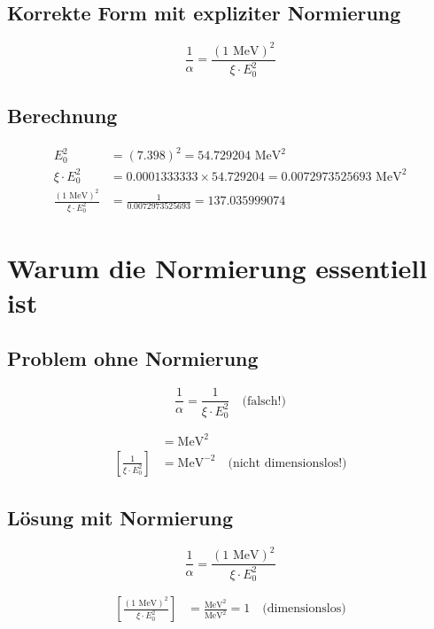 	\subsection*{Korrekte Form mit expliziter Normierung}
	
	\[
	\boxed{\frac{1}{\alpha} = \frac{(1 \text{ MeV})^2}{\xi \cdot E_0^2}}
	\]
	
	\subsection*{Berechnung}
	
	\begin{align*}
		E_0^2 &= (7.398)^2 = 54.729204 \text{ MeV}^2 \\
		\xi \cdot E_0^2 &= 0.0001333333 \times 54.729204 = 0.0072973525693 \text{ MeV}^2 \\
		\frac{(1 \text{ MeV})^2}{\xi \cdot E_0^2} &= \frac{1}{0.0072973525693} = 137.035999074
	\end{align*}
	
	\section*{Warum die Normierung essentiell ist}
	
	\subsection*{Problem ohne Normierung}
	
	\[
	\frac{1}{\alpha} = \frac{1}{\xi \cdot E_0^2} \quad \text{(falsch!)}
	\]
	
	\begin{align*}
		[\xi \cdot E_0^2] &= \text{MeV}^2 \\
		\left[\frac{1}{\xi \cdot E_0^2}\right] &= \text{MeV}^{-2} \quad \text{(nicht dimensionslos!)}
	\end{align*}
	
	\subsection*{Lösung mit Normierung}
	
	\[
	\frac{1}{\alpha} = \frac{(1 \text{ MeV})^2}{\xi \cdot E_0^2}
	\]
	
	\begin{align*}
		\left[\frac{(1 \text{ MeV})^2}{\xi \cdot E_0^2}\right] &= \frac{\text{MeV}^2}{\text{MeV}^2} = 1 \quad \text{(dimensionslos)}
	\end{align*}
	
